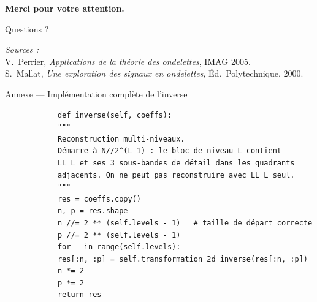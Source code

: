 \documentclass[10pt]{beamer}
\begin{document}
	\begin{frame}{}
		\begin{center}
			\vspace{1.5cm}
			{\Large\bfseries Merci pour votre attention.}
			
			\vspace{1.5cm}
			{\large Questions ?}
			
			\vspace{1.5cm}
			{\small
				\textit{Sources :}\\
				V.\ Perrier, \textit{Applications de la théorie des ondelettes}, IMAG 2005.\\
				S.\ Mallat, \textit{Une exploration des signaux en ondelettes}, \'Ed.\ Polytechnique, 2000.}
		\end{center}
	\end{frame}
	
	
	\appendix
	
	\begin{frame}[fragile]{Annexe — Implémentation complète de l'inverse}
		
		\begin{lstlisting}
			def inverse(self, coeffs):
			"""
			Reconstruction multi-niveaux.
			Démarre à N//2^(L-1) : le bloc de niveau L contient
			LL_L et ses 3 sous-bandes de détail dans les quadrants
			adjacents. On ne peut pas reconstruire avec LL_L seul.
			"""
			res = coeffs.copy()
			n, p = res.shape
			n //= 2 ** (self.levels - 1)   # taille de départ correcte
			p //= 2 ** (self.levels - 1)
			for _ in range(self.levels):
			res[:n, :p] = self.transformation_2d_inverse(res[:n, :p])
			n *= 2
			p *= 2
			return res
		\end{lstlisting}
		
	\end{frame}
	
\end{document}
